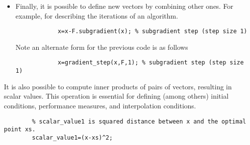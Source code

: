 \documentclass[11pt,a4paper]{article}
\begin{document}
\begin{enumerate}
\begin{itemize}
			\item Finally, it is possible to define new vectors by combining other ones. For example, for describing the iterations of an algorithm.\\[-1cm]
			\begin{lstlisting}
			x=x-F.subgradient(x); % subgradient step (step size 1)
			\end{lstlisting}
			Note an alternate form for the previous code is as follows\\[-1cm]
			\begin{lstlisting}
			x=gradient_step(x,F,1); % subgradient step (step size 1)
			\end{lstlisting}
		\end{itemize}
		It is also possible to compute inner products of pairs of vectors, resulting in scalar values. This operation is essential for defining (among others) initial conditions, performance measures, and interpolation conditions.\\[-1cm]
		\begin{lstlisting}
		% scalar_value1 is squared distance between x and the optimal point xs.
		scalar_value1=(x-xs)^2;


\end{lstlisting}
\end{enumerate}
\end{document}
